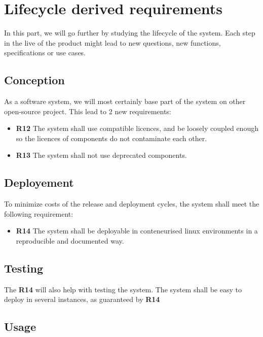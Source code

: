 \section{Lifecycle derived requirements}

In this part, we will go further by studying the lifecycle of the system. Each step in the live of the product might lead to new questions, new functions, specifications or use cases.

\subsection{Conception}

As a software system, we will most certainly base part of the system on other open-source project. This lead to 2 new requirements: 

\begin{itemize}
    \item \textbf{R12} The system shall use compatible licences, and be loosely coupled enough so the licences of components do not contaminate each other. 
    \item \textbf{R13} The system shall not use deprecated components.
\end{itemize}

\subsection{Deployement}

To minimize costs of the release and deployment cycles, the system shall meet the following requirement:

\begin{itemize}
    \item \textbf{R14} The system shall be deployable in conteneurised linux environments in a reproducible and documented way.  
\end{itemize}

\subsection{Testing}

The \textbf{R14} will also help with testing the system. The system shall be easy to deploy in several instances, as guaranteed by \textbf{R14}

\subsection{Usage}


